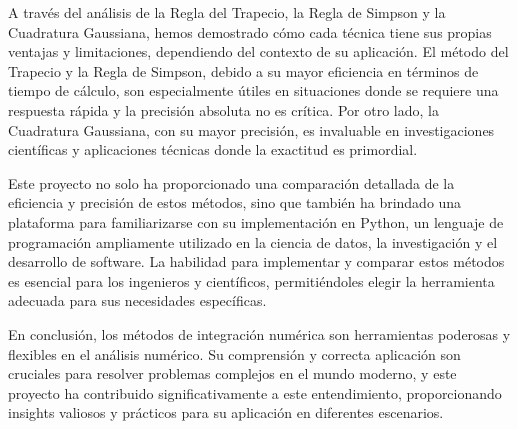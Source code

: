 \documentclass[a4paper]{article}
\begin{document}
    A través del análisis de la Regla del Trapecio, la Regla de Simpson y la Cuadratura Gaussiana, hemos demostrado cómo cada técnica tiene sus propias ventajas y limitaciones, dependiendo del contexto de su aplicación. El método del Trapecio y la Regla de Simpson, debido a su mayor eficiencia en términos de tiempo de cálculo, son especialmente útiles en situaciones donde se requiere una respuesta rápida y la precisión absoluta no es crítica. Por otro lado, la Cuadratura Gaussiana, con su mayor precisión, es invaluable en investigaciones científicas y aplicaciones técnicas donde la exactitud es primordial.
    
    Este proyecto no solo ha proporcionado una comparación detallada de la eficiencia y precisión de estos métodos, sino que también ha brindado una plataforma para familiarizarse con su implementación en Python, un lenguaje de programación ampliamente utilizado en la ciencia de datos, la investigación y el desarrollo de software. La habilidad para implementar y comparar estos métodos es esencial para los ingenieros y científicos, permitiéndoles elegir la herramienta adecuada para sus necesidades específicas.
    
    En conclusión, los métodos de integración numérica son herramientas poderosas y flexibles en el análisis numérico. Su comprensión y correcta aplicación son cruciales para resolver problemas complejos en el mundo moderno, y este proyecto ha contribuido significativamente a este entendimiento, proporcionando insights valiosos y prácticos para su aplicación en diferentes escenarios.
    
    
    \printbibliography
\end{document}
